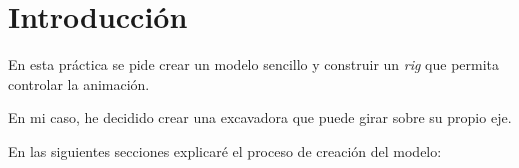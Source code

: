 \section{Introducción}

En esta práctica se pide crear un modelo sencillo y construir un \textit{rig} que permita controlar la animación.

\bigskip

En mi caso, he decidido crear una excavadora que puede girar sobre su propio eje.


En las siguientes secciones explicaré el proceso de creación del modelo: